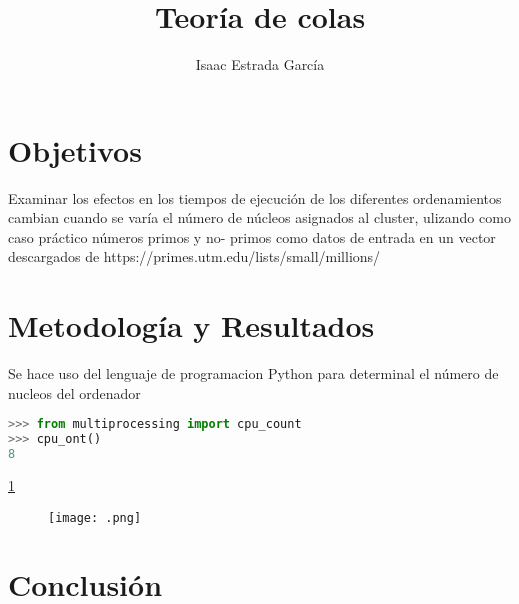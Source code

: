 \documentclass{article}
\title{Teor\'{i}a de colas}
\author{Isaac Estrada Garc\'{i}a }
\begin{document}
\maketitle
 
\section{Objetivos}
Examinar los efectos en los tiempos \citep{elis} de ejecuci\'{o}n de los diferentes ordenamientos cambian cuando se var\'{i}a el n\'{u}mero de n\'{u}cleos asignados al cluster, ulizando como caso pr\'{a}ctico n\'{u}meros primos y no- primos como datos de entrada en un vector descargados de https://primes.utm.edu/lists/small/millions/

\section{Metodolog\'{i}a y Resultados}
Se hace uso del lenguaje de programacion Python para determinal el n\'{u}mero de nucleos del ordenador
\begin{lstlisting}[language=python]
>>> from multiprocessing import cpu_count
>>> cpu_ont()
8
\end{lstlisting}

 \ref{fig}




\begin{figure}
  \centering\texttt{[image: .png]}
  \caption{}
  \label{fig}
\end{figure} 



\section{Conclusi\'{o}n}





 
\end{document}
